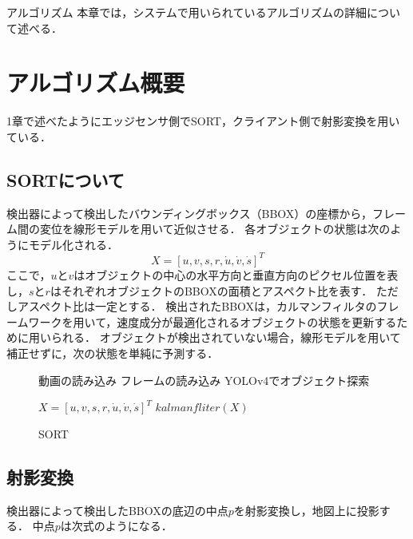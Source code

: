 \chapterhead
{アルゴリズム}
{本章では，システムで用いられているアルゴリズムの詳細について述べる．}

\section{アルゴリズム概要}
1章で述べたようにエッジセンサ側でSORT，クライアント側で射影変換を用いている．

\subsection{SORTについて}
検出器によって検出したバウンディングボックス（BBOX）の座標から，フレーム間の変位を線形モデルを用いて近似させる．
各オブジェクトの状態は次のようにモデル化される．
\begin{equation}
  X = [u, v, s, r, \dot{u} , \dot{v} , \dot{s}]^T
\end{equation}
ここで，$u$と$v$はオブジェクトの中心の水平方向と垂直方向のピクセル位置を表し，$s$と$r$はそれぞれオブジェクトのBBOXの面積とアスペクト比を表す．
ただしアスペクト比は一定とする．
検出されたBBOXは，カルマンフィルタのフレームワークを用いて，速度成分が最適化されるオブジェクトの状態を更新するために用いられる．
オブジェクトが検出されていない場合，線形モデルを用いて補正せずに，次の状態を単純に予測する．

\begin{figure}[!t]
	\begin{algorithm}[H]
	    \caption{SORT}
	    \label{alg1}
	    \begin{algorithmic}[1]
	    \STATE 動画の読み込み
	    \WHILE{}
	    \STATE フレームの読み込み
	    \STATE YOLOv4でオブジェクト探索
	    
	    \STATE $X = [u, v, s, r, \dot{u} , \dot{v} , \dot{s}]^T$ 
	    \STATE $kalmanfliter(X)$
	    \ENDIF
	    \ENDWHILE
	    \end{algorithmic}
	\end{algorithm}
\end{figure}
      
      \subsection{射影変換}
      検出器によって検出したBBOXの底辺の中点$p$を射影変換し，地図上に投影する．
      中点$p$は次式のようになる．

